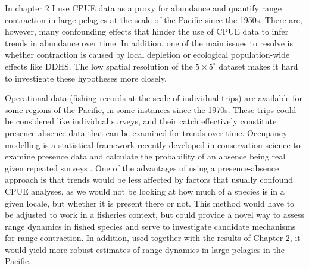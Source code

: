 \documentclass{article}
\newcommand{\griddef}[2]{$#1 \times #2^\circ$}
\begin{document}
In chapter 2 I use CPUE data as a proxy for abundance and
quantify range contraction in large pelagics at the scale of the Pacific
since the 1950s. There are, however, many confounding effects that
hinder the use of CPUE data to infer trends in abundance over time. In
addition, one of the main issues to resolve is whether contraction is
caused by local depletion or ecological population-wide effects like
DDHS. The low spatial resolution of the \griddef{5}{5} dataset makes
it hard to investigate these hypotheses more closely.

Operational data (fishing records at the scale of individual trips)
are available for some regions of the Pacific, in some instances since
the 1970s. These trips could be considered like individual surveys,
and their catch effectively constitute presence-absence data that can
be examined for trends over time. Occupancy modelling is a statistical
framework recently developed in conservation science to examine
presence data and calculate the probability of an absence being real
given repeated surveys \citep{Mackenzie2006_a}. One of the
advantages of using a presence-absence approach is that trends would
be less affected by factors that usually confound CPUE analyses, as we
would not be looking at how much of a species is in a given locale,
but whether it is present there or not. This method would have to be
adjusted to work in a fisheries context, but could provide a novel way
to assess range dynamics in fished species and serve to investigate
candidate mechanisms for range contraction.  In addition,
used together with the results of Chapter 2, it would yield more
robust estimates of range dynamics in large pelagics in the Pacific.






\newpage

\singlespacing


\end{document}
